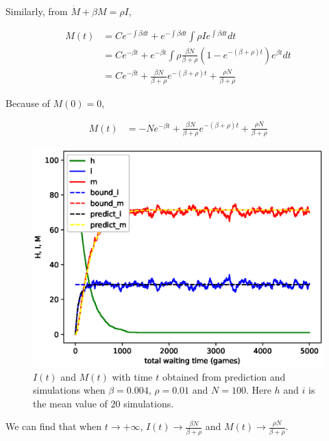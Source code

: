 Similarly, from $\dot{M} + \beta M = \rho I$,
\begin{small}
\begin{equation}
\nonumber
\begin{aligned}
M(t) &= C e^{-\int \beta dt} + e^{-\int \beta dt} \int \rho I e^{\int \beta dt} dt \\
&= C e^{- \beta t} + e^{- \beta t} \int \rho \frac{ \beta N }{ \beta + \rho } (1 - e^{-(\beta + \rho)t}) e^{ \beta t} dt \\
&= C e^{- \beta t} + \frac{ \beta N }{ \beta + \rho } e^{-(\beta + \rho)t} + \frac{ \rho N }{ \beta + \rho }
\end{aligned}
\end{equation}
\end{small}
Because of $M(0)=0$,
\begin{small}
\begin{equation}
\nonumber
\begin{aligned}
M(t) &= -N e^{- \beta t} + \frac{ \beta N }{ \beta + \rho } e^{-(\beta + \rho)t} + \frac{ \rho N }{ \beta + \rho }
\end{aligned}
\end{equation}
\end{small}
\begin{figure}
  \includegraphics[width=.45\textwidth]{fig/twohop_predict_sim.eps}
  \caption{$I(t)$ and $M(t)$ with time $t$ obtained from prediction and simulations
  when $\beta = 0.004$, $\rho = 0.01$ and $N=100$. Here $h$ and $i$ is the mean value of $20$ simulations.}
  \label{fig:twohop_predict_wod}
\end{figure}
We can find that when $t \rightarrow + \infty$, $I(t) \rightarrow \frac{ \beta N }{ \beta + \rho }$
and $M(t) \rightarrow \frac{ \rho N }{ \beta + \rho }$.

